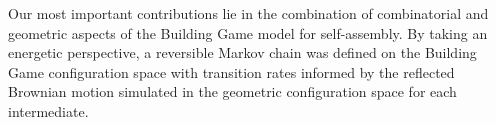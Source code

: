 




Our most important contributions lie in the combination of combinatorial and geometric aspects of the Building Game model for self-assembly. By taking an energetic perspective, a reversible Markov chain was defined on the Building Game configuration space with transition rates informed by the reflected Brownian motion simulated in the geometric configuration space for each intermediate. 

